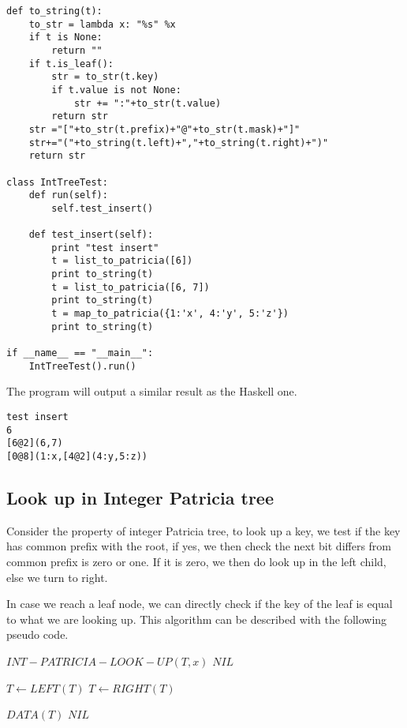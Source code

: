 \documentclass{article}
\begin{document}
\begin{lstlisting}
def to_string(t):
    to_str = lambda x: "%s" %x
    if t is None:
        return ""
    if t.is_leaf():
        str = to_str(t.key)
        if t.value is not None:
            str += ":"+to_str(t.value)
        return str
    str ="["+to_str(t.prefix)+"@"+to_str(t.mask)+"]"
    str+="("+to_string(t.left)+","+to_string(t.right)+")"
    return str

class IntTreeTest:
    def run(self):
        self.test_insert()

    def test_insert(self):
        print "test insert"
        t = list_to_patricia([6])
        print to_string(t)
        t = list_to_patricia([6, 7])
        print to_string(t)
        t = map_to_patricia({1:'x', 4:'y', 5:'z'})
        print to_string(t)

if __name__ == "__main__":
    IntTreeTest().run()
\end{lstlisting}

The program will output a similar result as the Haskell one.

\begin{verbatim}
test insert
6
[6@2](6,7)
[0@8](1:x,[4@2](4:y,5:z))
\end{verbatim}

\subsection{Look up in Integer Patricia tree}
Consider the property of integer Patricia tree, to look up a
key, we test if the key has common prefix with the root, if yes, we
then check the next bit differs from common prefix is zero or one. If
it is zero, we then do look up in the left child, else we turn to
right.

In case we reach a leaf node, we can directly check if the key of the
leaf is equal to what we are looking up. This algorithm can be
described with the following pseudo code.

\begin{algorithmic}
\STATE $INT-PATRICIA-LOOK-UP(T, x)$
    \RETURN $NIL$ \ENDIF

      \STATE $T \leftarrow LEFT(T)$
    \ELSE
      \STATE $T \leftarrow RIGHT(T)$
    \ENDIF
  \ENDWHILE

    \RETURN $DATA(T)$ 
  \ELSE
    \RETURN $NIL$
  \ENDIF
\end{algorithmic}
\end{document}

